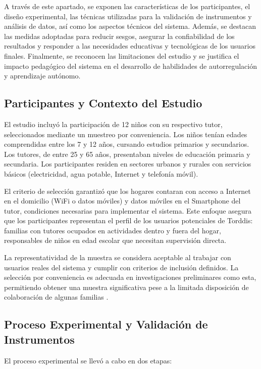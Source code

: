 \documentclass[a4paper,fleqn]{cas-sc}
\begin{document}
		A través de este apartado, se exponen las características de los participantes, el diseño experimental, las técnicas utilizadas para la validación de instrumentos y análisis de datos, así como los aspectos técnicos del sistema. Además, se destacan las medidas adoptadas para reducir sesgos, asegurar la confiabilidad de los resultados y responder a las necesidades educativas y tecnológicas de los usuarios finales. Finalmente, se reconocen las limitaciones del estudio y se justifica el impacto pedagógico del sistema en el desarrollo de habilidades de autorregulación y aprendizaje autónomo.
		
		\subsection{Participantes y Contexto del Estudio}
			El estudio incluyó la participación de 12 niños con su respectivo tutor, seleccionados mediante un muestreo por conveniencia. Los niños tenían edades comprendidas entre los 7 y 12 años, cursando estudios primarios y secundarios. Los tutores, de entre 25 y 65 años, presentaban niveles de educación primaria y secundaria. Los participantes residen en sectores urbanos y rurales con servicios básicos (electricidad, agua potable, Internet y telefonía móvil).
			
			El criterio de selección garantizó que los hogares contaran con acceso a Internet en el domicilio (WiFi o datos móviles) y datos móviles en el Smartphone del tutor, condiciones necesarias para implementar el sistema. Este enfoque asegura que los participantes representan el perfil de los usuarios potenciales de Torddis: familias con tutores ocupados en actividades dentro y fuera del hogar, responsables de niños en edad escolar que necesitan supervisión directa.
			
			La representatividad de la muestra se considera aceptable al trabajar con usuarios reales del sistema y cumplir con criterios de inclusión definidos. La selección por conveniencia es adecuada en investigaciones preliminares como esta, permitiendo obtener una muestra significativa pese a la limitada disposición de colaboración de algunas familias \citep{DiPietro2025Meta}.
		
		\subsection{Proceso Experimental y Validación de Instrumentos}
			El proceso experimental se llevó a cabo en dos etapas:
		
\end{document}
